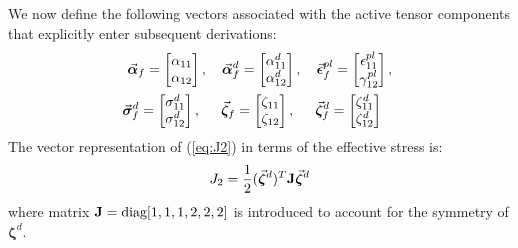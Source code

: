 We now define the following vectors associated with the active tensor
components that explicitly enter subsequent derivations:
\begin{gather}
	\bvec{\alpha}_f = \begin{bmatrix} \alpha_{11} \\ \alpha_{12} 
	\end{bmatrix},\quad
	\bvec{\alpha}^d_f = \begin{bmatrix} \alpha_{11}^d \\ \alpha_{12}^d 
	\end{bmatrix},\quad
	\bvec{\epsilon}^{pl}_f = \begin{bmatrix} \epsilon^{pl}_{11} \\ 
		\gamma^{pl}_{12} \end{bmatrix},\nonumber\\
	\hspace{-0.4cm}\bvec{\sigma}^d_f = \begin{bmatrix} \sigma^d_{11} \\ 
	\sigma^d_{12}
	\end{bmatrix},\quad\hspace{0.15cm}
	\bvec{\zeta}_f = \begin{bmatrix}
		\zeta_{11} \\ \zeta_{12}
	\end{bmatrix},\quad\hspace{0.15cm}
	\bvec{\zeta}_f^d = \begin{bmatrix}
		\zeta_{11}^d \\ \zeta_{12}^d
	\end{bmatrix}\nonumber
\end{gather}
The vector representation of (\ref{eq:J2}) in terms of the effective stress is:
\begin{equation}
	J_2 = \frac{1}{2}(\vec{\bm{\zeta}}^d)^T\mathbf{J}\vec{\bm{\zeta}}^d 
	\label{eq:VECTOR_J2_3D}
\end{equation}
\noindent where matrix $\mathbf{J} = \text{diag}[1, 1, 1, 2,2,2]$ is introduced to
account for the symmetry of $\bm{\zeta}^d$.

